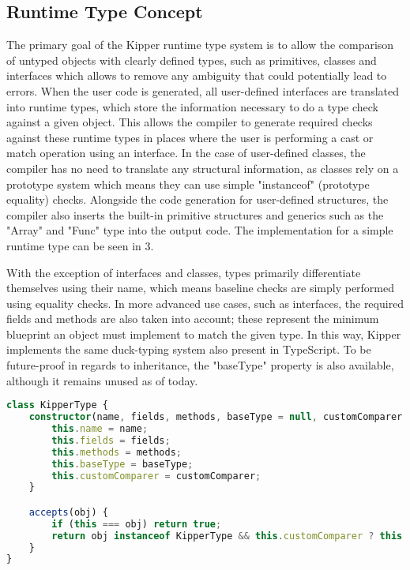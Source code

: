 \subsection{Runtime Type Concept}

The primary goal of the Kipper runtime type system is to allow the comparison of untyped objects with clearly defined types, such as primitives, classes and interfaces which allows to remove any ambiguity that could potentially lead to errors. When the user code is generated, all user-defined interfaces are translated into runtime types, which store the information necessary to do a type check against a given object. This allows the compiler to generate required checks against these runtime types in places where the user is performing a cast or match operation using an interface. In the case of user-defined classes, the compiler has no need to translate any structural information, as classes rely on a prototype system which means they can use simple "instanceof" (prototype equality) checks. Alongside the code generation for user-defined structures, the compiler also inserts the built-in primitive structures and generics such as the "Array" and "Func" type into the output code. The implementation for a simple runtime type can be seen in 3. 

With the exception of interfaces and classes, types primarily differentiate themselves using their name, which means baseline checks are simply performed using equality checks. In more advanced use cases, such as interfaces, the required fields and methods are also taken into account; these represent the minimum blueprint an object must implement to match the given type. In this way, Kipper implements the same duck-typing system also present in TypeScript. To be future-proof in regards to inheritance, the "baseType" property is also available, although it remains unused as of today.

\begin{lstlisting}[language=TypeScript,caption=The structure of a runtime type,label=lst:implementation:runtimetypestructure]
class KipperType {
	constructor(name, fields, methods, baseType = null, customComparer = null) {
		this.name = name; 
		this.fields = fields;
		this.methods = methods;
		this.baseType = baseType;
		this.customComparer = customComparer;
	}

	accepts(obj) {
		if (this === obj) return true;
		return obj instanceof KipperType && this.customComparer ? this.customComparer(this, obj) : false;
	}
}
\end{lstlisting}

